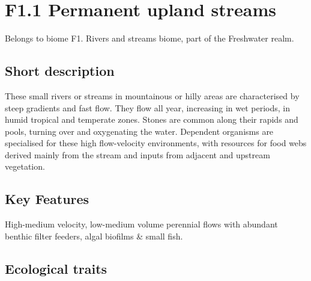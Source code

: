 \documentclass[
  letterpaper,
  DIV=11,
  numbers=noendperiod]{scrartcl}
\author{}
\date{}
\begin{document}
\section{F1.1 Permanent upland
streams}\label{f1.1-permanent-upland-streams}

Belongs to biome F1. Rivers and streams biome, part of the Freshwater
realm.

\subsection{Short description}\label{short-description}

These small rivers or streams in mountainous or hilly areas are
characterised by steep gradients and fast flow. They flow all year,
increasing in wet periods, in humid tropical and temperate zones. Stones
are common along their rapids and pools, turning over and oxygenating
the water. Dependent organisms are specialised for these high
flow-velocity environments, with resources for food webs derived mainly
from the stream and inputs from adjacent and upstream vegetation.

\subsection{Key Features}\label{key-features}

High-medium velocity, low-medium volume perennial flows with abundant
benthic filter feeders, algal biofilms \& small fish.

\subsection{Ecological traits}\label{ecological-traits}
\end{document}
